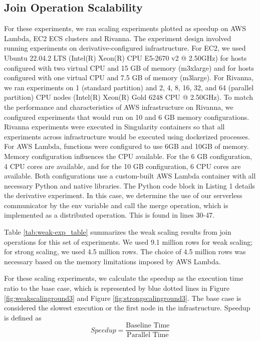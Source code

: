 \documentclass[conference]{IEEEtran}
\begin{document}
\subsection{Join Operation Scalability}

For these experiments, we ran scaling experiments plotted as speedup on AWS Lambda, EC2 ECS clusters and Rivanna.  The experiment design involved running experiments on derivative-configured infrastructure.  For EC2,  we used Ubuntu 22.04.2 LTS (Intel(R) Xeon(R) CPU E5-2670 v2 @ 2.50GHz) for hosts configured with two virtual CPU and 15 GB of memory (m3xlarge) and for hosts configured with one virtual CPU and 7.5 GB of memory (m3large).  For Rivanna, we ran experiments on 1 (standard partition) and 2, 4, 8, 16, 32, and 64 (parallel partition) CPU nodes (Intel(R) Xeon(R) Gold 6248 CPU @ 2.50GHz).  To match the performance and characteristics of AWS infrastructure on Rivanna, we configured experiments that would run on 10 and 6 GB memory configurations.  Rivanna experiments were executed in Singularity containers so that all experiments across infrastructure would be executed using dockerized processes.  For AWS Lambda, functions were configured to use 6GB and 10GB of memory.  Memory configuration influences the CPU available.  For the 6 GB configuration, 4 CPU cores are available, and for the 10 GB configuration, 6 CPU cores are available.  Both configurations use a custom-built AWS Lambda container with all necessary Python and native libraries.  The Python code block in Listing 1 details the derivative experiment.  In this case, we determine the use of our serverless communicator by the env variable and call the merge operation, which is implemented as a distributed operation.  This is found in lines 30-47.







Table \ref{tab:weak-exp_table} summarizes the weak scaling results from join
operations for this set of experiments.  We used 9.1 million rows for weak scaling; for strong scaling, we used 4.5 million rows.  The choice of 4.5 million rows was necessary based on the memory limitations imposed by AWS Lambda.    

For these scaling experiments, we calculate the speedup as the execution time ratio to the base case, which is represented by blue dotted lines in Figure \ref{fig:weakscalinground3} and Figure \ref{fig:strongscalinground3}.  The base case is considered the slowest execution or the first node in the infrastructure.  Speedup is defined as
\[
    Speedup = \frac{\text{Baseline Time}}{\text{Parallel Time}}
\]
\end{document}
